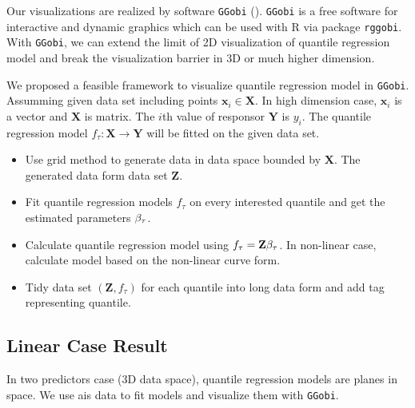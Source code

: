 \documentclass[article]{jss}
\theoremstyle{definition}
\theoremstyle{definition}
\theoremstyle{remark}
\begin{document}
Our visualizations are realized by software \texttt{GGobi}
(\citet{swayne2003ggobi}). \texttt{GGobi} is a free software for
interactive and dynamic graphics which can be used with R via package
\texttt{rggobi}. With \texttt{GGobi}, we can extend the limit of 2D
visualization of quantile regression model and break the visualization
barrier in 3D or much higher dimension.

We proposed a feasible framework to visualize quantile regression model
in \texttt{GGobi}. Assumming given data set including points
\(\boldsymbol{x}_{i} \in \boldsymbol{X}\). In high dimension case,
\(\boldsymbol{x}_i\) is a vector and \(\boldsymbol{X}\) is matrix. The
\(i\)th value of responsor \(\boldsymbol{Y}\) is \(y_i\). The quantile
regression model \(f_{\tau}:\boldsymbol{X} \rightarrow \boldsymbol{Y}\)
will be fitted on the given data set.

\begin{itemize}
\item
  Use grid method to generate data in data space bounded by
  \(\boldsymbol{X}\). The generated data form data set
  \(\boldsymbol{Z}\).
\item
  Fit quantile regression models \(f_{\tau}\) on every interested
  quantile and get the estimated parameters \(\bold{\beta}_{\tau}\).
\item
  Calculate quantile regression model using
  \(f_{\tau} = \bold{Z}\bold{\beta}_{\tau}\). In non-linear case,
  calculate model based on the non-linear curve form.
\item
  Tidy data set \((\boldsymbol{Z}, f_{\tau})\) for each quantile into
  long data form and add tag representing quantile.
\end{itemize}

\subsection{Linear Case Result}\label{linear-case-result}

In two predictors case (3D data space), quantile regression models are
planes in space. We use ais data to fit models and visualize them with
\texttt{GGobi}.
\end{document}
